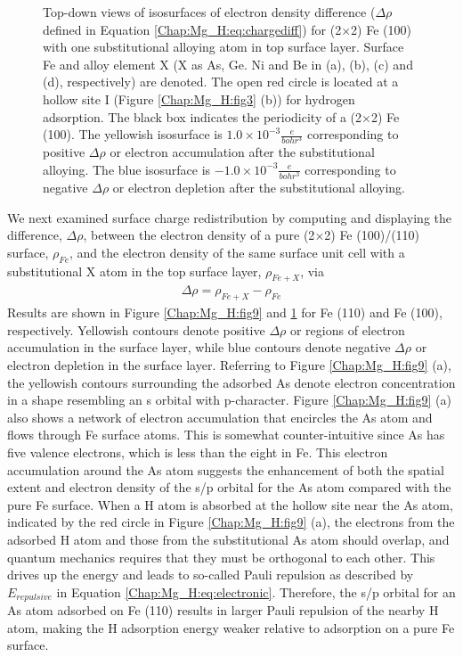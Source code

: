 \begin{figure}[!ht]
\caption[Top-down views of isosurfaces of electron density difference for (2$\times$2) Fe (100) with one substitutional alloying atom in top surface layer]{Top-down views of isosurfaces of electron density difference ($\Delta \rho$ defined in Equation \ref{Chap:Mg_H:eq:chargediff}) for (2$\times$2) Fe (100) with one substitutional alloying atom in top surface layer. Surface Fe and alloy element X (X as As, Ge. Ni and Be in (a), (b), (c) and (d), respectively) are denoted. The open red circle is located at a hollow site I (Figure \ref{Chap:Mg_H:fig3} (b)) for hydrogen adsorption. The black box indicates the periodicity of a (2$\times$2) Fe (100). The yellowish isosurface is $1.0\times10^{-3}\frac{e}{bohr^3}$ corresponding to positive $\Delta \rho$ or electron accumulation after the substitutional alloying. The blue isosurface is $-1.0\times10^{-3}\frac{e}{bohr^3}$ corresponding to negative $\Delta \rho$ or electron depletion after the substitutional alloying.}
  \label{Chap:Mg_H:fig10}
\end{figure}
\endgroup

We next examined surface charge redistribution by computing and displaying the difference, $\Delta \rho$, between the electron density of a pure (2$\times$2) Fe (100)/(110) surface, $\rho_{Fe}$, and the electron density of the same surface unit cell with a substitutional X atom in the top surface layer, $\rho_{Fe+X}$, via
\begin{align}
\Delta \rho = \rho_{Fe+ X} - \rho_{Fe}
\label{Chap:Mg_H:eq:chargediff}
\end{align}
Results are shown in Figure \ref{Chap:Mg_H:fig9} and \ref{Chap:Mg_H:fig10} for Fe (110) and Fe (100), respectively. Yellowish contours denote positive $\Delta \rho$ or regions of electron accumulation in the surface layer, while blue contours denote negative $\Delta \rho$ or electron depletion in the surface layer. Referring to Figure \ref{Chap:Mg_H:fig9} (a), the yellowish contours surrounding the adsorbed As denote electron concentration in a shape resembling an s orbital with p-character. Figure \ref{Chap:Mg_H:fig9} (a) also shows a network of electron accumulation that encircles the As atom and flows through Fe surface atoms. This is somewhat counter-intuitive since As has five valence electrons, which is less than the eight in Fe. This electron accumulation around the As atom suggests the enhancement of both the spatial extent and electron density of the s/p orbital for the As atom compared with the pure Fe surface. When a H atom is absorbed at the hollow site near the As atom, indicated by the red circle in Figure \ref{Chap:Mg_H:fig9} (a), the electrons from the adsorbed H atom and those from the substitutional As atom should overlap, and quantum mechanics requires that they must be orthogonal to each other. This drives up the energy and leads to so-called Pauli repulsion as described by $E_{repulsive}$ in Equation \ref{Chap:Mg_H:eq:electronic}. Therefore, the s/p orbital for an As atom adsorbed on Fe (110) results in larger Pauli repulsion of the nearby H atom, making the H adsorption energy weaker relative to adsorption on a pure Fe surface. 


